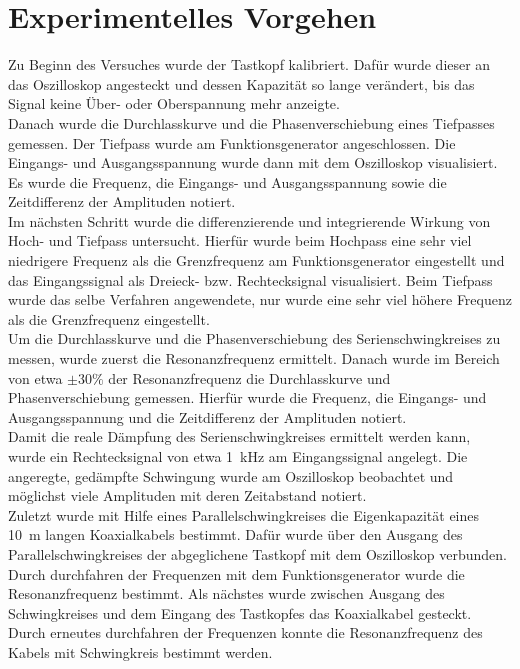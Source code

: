 \documentclass[a4paper,usenatbib]{aspdoc}
\begin{document}
    \section{Experimentelles Vorgehen}\label{sec:experiment}
        Zu Beginn des Versuches wurde der Tastkopf kalibriert. Dafür wurde dieser an das Oszilloskop angesteckt und dessen Kapazität so lange verändert, bis das Signal keine Über- oder Oberspannung mehr anzeigte. \\
        Danach wurde die Durchlasskurve und die Phasenverschiebung eines Tiefpasses gemessen. Der Tiefpass wurde am Funktionsgenerator angeschlossen. Die Eingangs- und Ausgangsspannung wurde dann mit dem Oszilloskop visualisiert. Es wurde die Frequenz, die Eingangs- und Ausgangsspannung sowie die Zeitdifferenz der Amplituden notiert.\\
        Im nächsten Schritt wurde die differenzierende und integrierende Wirkung von Hoch- und Tiefpass untersucht. Hierfür wurde beim Hochpass eine sehr viel niedrigere Frequenz als die Grenzfrequenz am Funktionsgenerator eingestellt und das Eingangssignal als Dreieck- bzw. Rechtecksignal visualisiert. Beim Tiefpass wurde das selbe Verfahren angewendete, nur wurde eine sehr viel höhere Frequenz als die Grenzfrequenz eingestellt.\\
        Um die Durchlasskurve und die Phasenverschiebung des Serienschwingkreises zu messen, wurde zuerst die Resonanzfrequenz ermittelt. Danach wurde im Bereich von etwa $\pm 30\%$ der Resonanzfrequenz die Durchlasskurve und Phasenverschiebung gemessen. Hierfür wurde die Frequenz, die Eingangs- und Ausgangsspannung und die Zeitdifferenz der Amplituden notiert.\\
        Damit die reale Dämpfung des Serienschwingkreises ermittelt werden kann, wurde ein Rechtecksignal von etwa \SI{1}{\kilo\hertz} am Eingangssignal angelegt. Die angeregte, gedämpfte Schwingung wurde am Oszilloskop beobachtet und möglichst viele Amplituden mit deren Zeitabstand notiert. \\
        Zuletzt wurde mit Hilfe eines Parallelschwingkreises die Eigenkapazität eines \SI{10}{\metre} langen Koaxialkabels bestimmt. Dafür wurde über den Ausgang des Parallelschwingkreises der abgeglichene Tastkopf mit dem Oszilloskop verbunden. Durch durchfahren der Frequenzen mit dem Funktionsgenerator wurde die Resonanzfrequenz bestimmt. Als nächstes wurde zwischen Ausgang des Schwingkreises und dem Eingang des Tastkopfes das Koaxialkabel gesteckt. Durch erneutes durchfahren der Frequenzen konnte die Resonanzfrequenz des Kabels mit Schwingkreis bestimmt werden.
\end{document}
